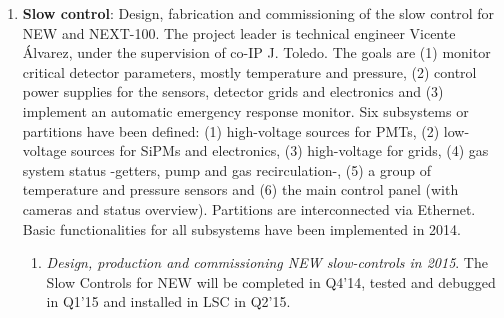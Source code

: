 \begin{enumerate}
\item {\bf Slow control}: Design, fabrication and commissioning of the slow control for NEW and NEXT-100. The project leader is technical engineer Vicente Álvarez, under the supervision of co-IP J. Toledo. The goals are (1) monitor critical detector parameters, mostly temperature and pressure, (2) control power supplies for the sensors, detector grids and electronics and (3) implement an automatic emergency response monitor.
Six subsystems or partitions have been defined: (1) high-voltage sources for PMTs, (2) low-voltage sources for SiPMs and electronics, (3) high-voltage for grids, (4) gas system status -getters, pump and gas recirculation-, (5) a group of temperature and pressure sensors and (6) the main control panel (with cameras and status overview). Partitions are interconnected via Ethernet. Basic functionalities for all subsystems have been implemented in 2014.


\begin{enumerate}
\item {\em Design, production and commissioning NEW slow-controls in 2015}. The Slow Controls for NEW will be completed in Q4’14, tested and debugged in  Q1’15 and installed in LSC in Q2’15.

\end{enumerate}


\end{enumerate}
